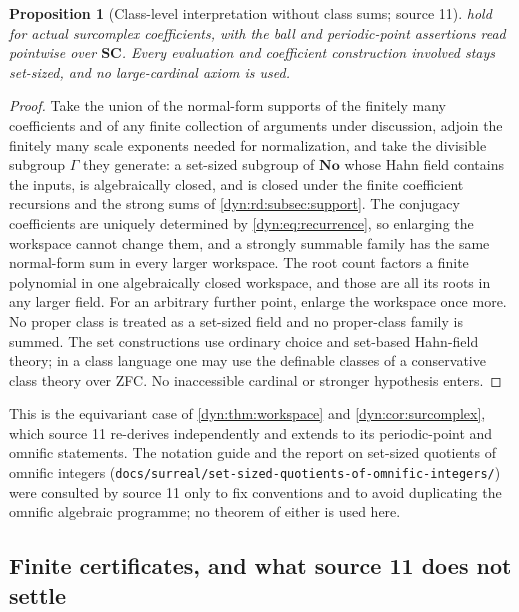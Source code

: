 \documentclass[11pt,letterpaper]{article}
\newtheorem{proposition}[proposition]{Proposition}
\theoremstyle{definition}
\theoremstyle{remark}
\newcommand{\No}{\mathbf{No}}
\newcommand{\SC}{\mathbf{SC}}
\numberwithin{equation}{section}
\begin{document}
\begin{proposition}[Class-level interpretation without class sums; source
11]\label{dyn:rd:prop:transfer}
 hold for actual surcomplex coefficients, with the ball
and periodic-point assertions read pointwise over $\SC$. Every evaluation and
coefficient construction involved stays set-sized, and no large-cardinal
axiom is used.
\end{proposition}
\begin{proof}
Take the union of the normal-form supports of the finitely many
coefficients and of any finite collection of arguments under discussion,
adjoin the finitely many scale exponents needed for normalization, and take
the divisible subgroup $\Gamma$ they generate: a set-sized subgroup of
$\No$ whose Hahn field contains the inputs, is algebraically closed, and is
closed under the finite coefficient recursions and the strong sums of
\cref{dyn:rd:subsec:support}. The conjugacy coefficients are uniquely
determined by \eqref{dyn:eq:recurrence}, so enlarging the workspace cannot
change them, and a strongly summable family has the same normal-form sum in
every larger workspace. The root count factors a finite polynomial in one
algebraically closed workspace, and those are all its roots in any larger
field. For an arbitrary further point, enlarge the workspace once more. No
proper class is treated as a set-sized field and no proper-class family is
summed. The set constructions use ordinary choice and set-based Hahn-field
theory; in a class language one may use the definable classes of a
conservative class theory over ZFC. No inaccessible cardinal or stronger
hypothesis enters.
\end{proof}

This is the equivariant case of \cref{dyn:thm:workspace} and
\cref{dyn:cor:surcomplex}, which source 11 re-derives independently and
extends to its periodic-point and omnific statements. The notation guide
and the report on set-sized quotients of omnific integers
(\texttt{docs/\allowbreak surreal/\allowbreak set-sized-quotients-of-\allowbreak omnific-integers/})
were
consulted by source 11 only to fix conventions and to avoid duplicating the
omnific algebraic programme; no theorem of either is used here.

\subsection{Finite certificates, and what source 11 does not settle}
\label{dyn:rd:subsec:limits}
\end{document}
